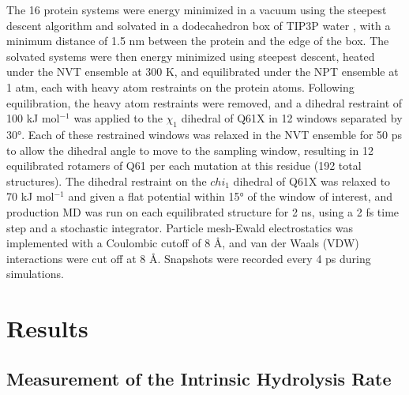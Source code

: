 The 16 protein systems were energy minimized in a vacuum using the steepest descent algorithm and solvated in a dodecahedron box of TIP3P water \cite{Jorgensen1983}, with a minimum distance of 1.5 nm between the protein and the edge of the box. 
The solvated systems were then energy minimized using steepest descent, heated under the NVT ensemble at 300 K, and equilibrated under the NPT ensemble at 1 atm, each with heavy atom restraints on the protein atoms. 
Following equilibration, the heavy atom restraints were removed, and a dihedral restraint of 100 kJ mol$^{-1}$ was applied to the $\chi_1$ dihedral of Q61X in 12 windows separated by \ang{30}. 
Each of these restrained windows was relaxed in the NVT ensemble for 50 ps to allow the dihedral angle to move to the sampling window, resulting in 12 equilibrated rotamers of Q61 per each mutation at this residue (192 total structures). 
The dihedral restraint on the $chi_1$ dihedral of Q61X was relaxed to 70 kJ mol$^{-1}$ and given a flat potential within \ang{15} of the window of interest, and production MD was run on each equilibrated structure for 2 ns, using a 2 fs time step and a stochastic integrator. 
Particle mesh-Ewald electrostatics\cite{Cheatham1995} was implemented with a Coulombic cutoff of 8 \si{\angstrom}, and van der Waals (VDW) interactions were cut off at 8 \si{\angstrom}. 
Snapshots were recorded every 4 ps during simulations.

\section{Results} \label{pKa-results}

\subsection{Measurement of the Intrinsic Hydrolysis Rate}

